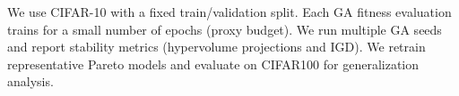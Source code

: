 We use CIFAR-10 with a fixed train/validation split. Each GA fitness evaluation trains for a small number of epochs (proxy budget).
We run multiple GA seeds and report stability metrics (hypervolume projections and IGD). We retrain representative Pareto models
and evaluate on CIFAR100 for generalization analysis.
